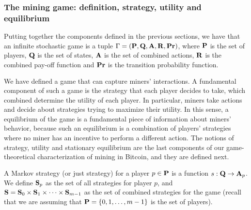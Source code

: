 \subsubsection{The mining game: definition, strategy, utility and equilibrium}
Putting together the components defined in the previous sections, we have that 
an infinite stochastic game is a tuple $\Gamma = (\mathbf{P},\mathbf{Q},\mathbf{A},\mathbf{R},\mathbf{Pr})$, where $\mathbf{P}$ is the set of players, $\mathbf{Q}$ is the set of states, $\mathbf{A}$ is the set of combined actions, $\mathbf{R}$ is the combined pay-off function 
and $\mathbf{Pr}$ is the transition probability function. 


We have defined a game that can capture miners' interactions. A fundamental component of such a game is the strategy that each player decides to take, which combined determine the utility of each player. In particular, miners take actions and decide about strategies trying to maximize their utility. In this sense, a 
equilibrium of the game is a fundamental piece of information about miners' behavior, because such an equilibrium is a combination of players' strategies where no miner has an incentive to perform a different action. The notions of strategy, utility and stationary equilibrium are the last components of our game-theoretical characterization of mining in Bitcoin, and they are defined next. 

A Markov strategy (or just strategy) for a player $p \in \mathbf{P}$ is a function $s : \mathbf{Q} \rightarrow \mathbf{A}_p$.
We define $\mathbf{S}_p$ as the set of all strategies for player $p$, and $\mathbf{S} = \mathbf{S}_0 \times \mathbf{S}_{1} \times \cdots \times \mathbf{S}_{m-1}$ as the set of combined strategies for the game (recall that we are assuming that $\mathbf{P} = \{0, 1, \ldots, m-1\}$ is the set of players).

